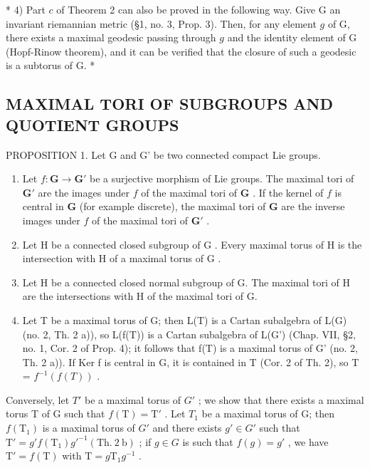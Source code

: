 * 4) Part \(c\) of Theorem 2 can also be proved in the following way. Give G an invariant riemannian metric (§1, no. 3, Prop. 3). Then, for any element \(g\) of G, there exists a maximal geodesic passing through \(g\) and the identity element of G (Hopf-Rinow theorem), and it can be verified that the closure of such a geodesic is a subtorus of G. *

\subsection{MAXIMAL TORI OF SUBGROUPS AND QUOTIENT GROUPS}

PROPOSITION 1. Let G and G' be two connected compact Lie groups.

\begin{enumerate}
\def\labelenumi{\alph{enumi})}
\item
  Let \(f: \mathbf{G} \to \mathbf{G}'\) be a surjective morphism of Lie groups. The maximal tori of \(\mathbf{G}'\) are the images under \(f\) of the maximal tori of \(\mathbf{G}\) . If the kernel of \(f\) is central in \(\mathbf{G}\) (for example discrete), the maximal tori of \(\mathbf{G}\) are the inverse images under \(f\) of the maximal tori of \(\mathbf{G}'\) .
\item
  Let \(\mathrm{H}\) be a connected closed subgroup of \(\mathrm{G}\) . Every maximal torus of \(\mathrm{H}\) is the intersection with \(\mathrm{H}\) of a maximal torus of \(\mathrm{G}\) .
\item
  Let H be a connected closed normal subgroup of G. The maximal tori of H are the intersections with H of the maximal tori of G.
\item
  Let T be a maximal torus of G; then L(T) is a Cartan subalgebra of L(G) (no. 2, Th. 2 a)), so L(f(T)) is a Cartan subalgebra of L(G') (Chap. VII, §2, no. 1, Cor. 2 of Prop. 4); it follows that f(T) is a maximal torus of G' (no. 2, Th. 2 a)). If Ker f is central in G, it is contained in T (Cor. 2 of Th. 2), so T = \(f^{-1}(f(T))\) .
\end{enumerate}

Conversely, let \(T'\) be a maximal torus of \(G'\) ; we show that there exists a maximal torus T of G such that \(f(\mathrm{T}) = \mathrm{T}'\) . Let \(T_{1}\) be a maximal torus of G; then \(f(\mathrm{T}_{1})\) is a maximal torus of \(G'\) and there exists \(g' \in G'\) such that \(\mathrm{T}' = g' f(\mathrm{T}_{1}) g'^{-1} (\mathrm{Th.~2~b})\) ; if \(g \in G\) is such that \(f(g) = g'\) , we have \(\mathrm{T}' = f(\mathrm{T})\) with \(\mathrm{T} = g\mathrm{T}_{1}g^{-1}\) .

